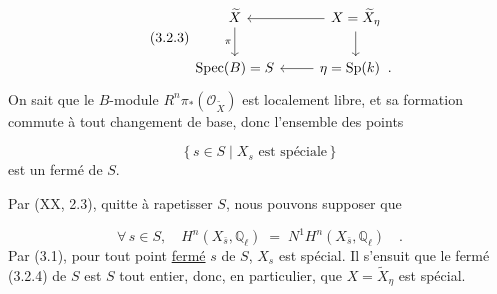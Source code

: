 \begin{equation}\tag{3.2.3}
\begin{tikzcd}
\widetilde{X} \arrow[d, "\pi"'] & X = \widetilde{X}_{\eta} \arrow[l] \arrow[d] \\
\mathrm{Spec}(B) = S & \eta = \mathrm{Sp}(k) \;\; . \arrow[l]
\end{tikzcd}
\end{equation}
On sait que le $B$-module $R^n\pi_*(\mathcal{O}_{\widetilde{X}})$ est localement libre, et sa formation commute à tout changement de base, donc l'ensemble des points 



\begin{equation}\tag{3.2.4}
 \{\, s \in S \mid X_s \text{ est spéciale} \,\}
\end{equation}
est un fermé de $S$.

Par (XX, 2.3), quitte à rapetisser $S$, nous pouvons supposer que

\begin{equation}\tag{3.2.5}
\forall\, s \in S, \quad H^n(X_{\bar{s}}, \mathbb{Q}_\ell) \;=\; N^1 H^n(X_{\bar{s}}, \mathbb{Q}_\ell) \quad .
\end{equation}
Par (3.1), pour tout point \underline{fermé} $s$ de $S$, $X_s$ est spécial. Il s'ensuit que le fermé (3.2.4) de $S$ est $S$ tout entier, donc, en particulier, que $X = \tilde{X}_\eta$ est spécial.


